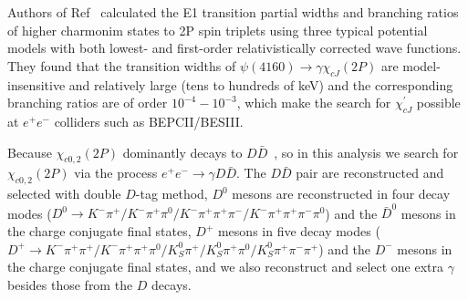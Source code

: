 \documentclass[aps,preprint,tightenlines,superscriptaddress,showpacs,byrevtex,amsmath,amssymb,nofloatfix]{revtex4}
\begin{document}

 Authors of Ref~\cite{chicj2p_th1} calculated the E1 transition partial widths and branching ratios of higher charmonim states to 2P spin triplets using three typical potential models with both lowest- and first-order relativistically corrected wave functions. They found that the transition widths of $\psi(4160)\to \gamma \chi_{cJ}(2P) $ are model-insensitive and relatively large (tens to hundreds of keV) and the corresponding branching ratios are of order $10^{-4}-10^{-3}$, which make the search for $\chi_{cJ}^{'}$ possible at $e^{+}e^{-}$ colliders such as BEPCII/BESIII.

Because  $\chi_{c0,2} (2P)$ dominantly decays to $D\bar{D}$~\cite{Highercharmonia}, so in this analysis we search for $\chi_{c0,2} (2P)$ via the process  $e^{+}e^{-}\rightarrow \gamma D\bar{D}$. The $D\bar{D}$ pair are reconstructed and selected with double $D$-tag method, $D^{0}$ mesons are reconstructed in four decay modes ($D^{0} \rightarrow K^{-}\pi^{+}/K^{-}\pi^{+}\pi^{0}/K^{-}\pi^{+}\pi^{+}\pi^{-}/K^{-}\pi^{+}\pi^{+}\pi^{-}\pi^{0}$) and the $\bar{D}^{0}$ mesons in the charge conjugate final states, $D^{+}$ mesons in five decay modes ($D^{+} \rightarrow K^{-}\pi^{+}\pi^{+}/K^{-}\pi^{+}\pi^{+}\pi^{0}/ K^{0}_{S}\pi^{+}/K^{0}_{S}\pi^{+}\pi^{0}/K^{0}_{S}\pi^{+}\pi^{-}\pi^{+}$) and the $D^{-}$ mesons in the charge conjugate final states, and we also reconstruct and select one extra $\gamma$ besides those from the $D$ decays.
\end{document}
